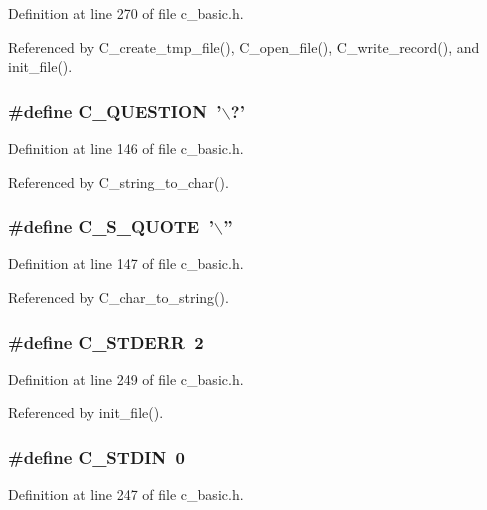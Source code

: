 Definition at line 270 of file c\_\-basic.h.

Referenced by C\_\-create\_\-tmp\_\-file(), C\_\-open\_\-file(), C\_\-write\_\-record(), and init\_\-file().
\subsubsection{\setlength{\rightskip}{0pt plus 5cm}\#define C\_\-QUESTION~'$\backslash$?'}\label{c__basic_8h_e1bd12705e2c1882237d9effcbe498cd}




Definition at line 146 of file c\_\-basic.h.

Referenced by C\_\-string\_\-to\_\-char().
\subsubsection{\setlength{\rightskip}{0pt plus 5cm}\#define C\_\-S\_\-QUOTE~'$\backslash$''}\label{c__basic_8h_c61c746283ff8f721696747afb6302bc}




Definition at line 147 of file c\_\-basic.h.

Referenced by C\_\-char\_\-to\_\-string().
\subsubsection{\setlength{\rightskip}{0pt plus 5cm}\#define C\_\-STDERR~2}\label{c__basic_8h_e6194ca71997c7c8b822b062d5af46cd}




Definition at line 249 of file c\_\-basic.h.

Referenced by init\_\-file().
\subsubsection{\setlength{\rightskip}{0pt plus 5cm}\#define C\_\-STDIN~0}\label{c__basic_8h_8bcee6191217fe994985333798b62467}




Definition at line 247 of file c\_\-basic.h.

